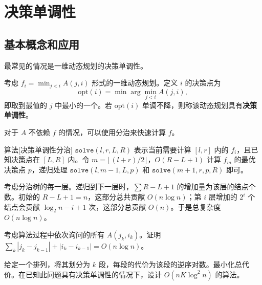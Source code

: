 \chapter{决策单调性}

\section{基本概念和应用}

最常见的情况是一维动态规划的决策单调性。
\begin{definition}[一维决策单调性]
考虑 $f_i=\min_{j<i} A(j,i)$ 形式的一维动态规划。定义 $i$ 的决策点为
$$
\mathrm{opt}(i)=\min\arg\min_{j<i}A(j,i),
$$
即取到最值的 $j$ 中最小的一个。若 $\mathrm{opt}(i)$ 单调不降，则称该动态规划具有\textbf{决策单调性}。
\end{definition}

对于 $A$ 不依赖 $f$ 的情况，可以使用分治来快速计算 $f$。

\begin{descbox}{算法}[决策单调性分治]
    $\mathtt{solve}(l,r,L,R)$ 表示当前需要计算 $[l,r]$ 内的 $f_i$，且已知决策点在 $[L,R]$ 内。令 $m=\lfloor(l+r)/2\rfloor$，$O(R-L+1)$ 计算 $f_m$ 的最优决策点 $p$，递归处理 $\mathtt{solve}(l,m-1,L,p)$ 和 $\mathtt{solve}(m+1,r,p,R)$ 即可。
    
    考虑分治树的每一层。递归到下一层时，$\sum R-L+1$ 的增加量为该层的结点个数。初始的 $R-L+1=n$，这部分总共贡献 $O(n\log n)$；第 $i$ 层增加的 $2^i$ 个结点会贡献 $\log_2 n-i+1$ 次，这部分总贡献 $O(n)$。于是总复杂度 $O(n\log n)$。
\end{descbox}
\begin{exercise}
    考虑算法过程中依次询问的所有 $A(j_k,i_k)$。证明 $\sum_k |j_k-j_{k-1}|+|i_k-i_{k-1}|=O(n\log n)$。
\end{exercise}
\begin{exercise}
    给定一个排列，将其划分为 $k$ 段，每段的代价为该段的逆序对数。最小化总代价。在已知此问题具有决策单调性的情况下，设计 $O(nK\log^2 n)$ 的算法。
\end{exercise}






